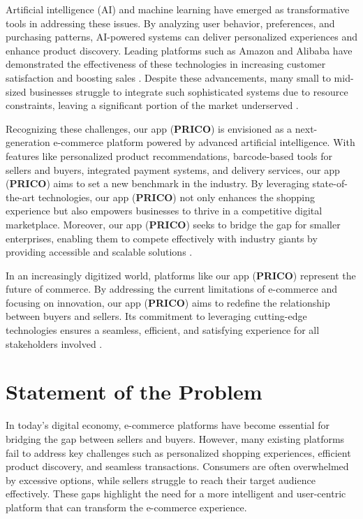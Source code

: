\documentclass[12pt]{report}
\begin{document}
Artificial intelligence (AI) and machine learning have emerged as transformative tools in
addressing these issues. By analyzing user behavior, preferences, and purchasing patterns,
AI-powered systems can deliver personalized experiences and enhance product discovery.
Leading platforms such as Amazon and Alibaba have demonstrated the effectiveness of these
technologies in increasing customer satisfaction and boosting sales \cite{c2}\cite{c3}. Despite these
advancements, many small to mid-sized businesses struggle to integrate such sophisticated
systems due to resource constraints, leaving a significant portion of the market underserved
\cite{c3}.

Recognizing these challenges, our app (\textbf{PRICO}) is envisioned as a next-generation
e-commerce platform powered by advanced artificial intelligence. With features like
personalized product recommendations, barcode-based tools for sellers and buyers, integrated
payment systems, and delivery services, our app (\textbf{PRICO}) aims to set a new benchmark in
the industry. By leveraging state-of-the-art technologies, our app (\textbf{PRICO}) not only enhances
the shopping experience but also empowers businesses to thrive in a competitive digital
marketplace. Moreover, our app (\textbf{PRICO}) seeks to bridge the gap for smaller enterprises,
enabling them to compete effectively with industry giants by providing accessible and
scalable solutions \cite{c1}\cite{c4}.

In an increasingly digitized world, platforms like our app (\textbf{PRICO}) represent the future of
commerce. By addressing the current limitations of e-commerce and focusing on innovation,
our app (\textbf{PRICO}) aims to redefine the relationship between buyers and sellers. Its
commitment to leveraging cutting-edge technologies ensures a seamless, efficient, and
satisfying experience for all stakeholders involved \cite{c2}\cite{c5}.

\section{Statement of the Problem}

In today's digital economy, e-commerce platforms have become essential for bridging the gap
between sellers and buyers. However, many existing platforms fail to address key challenges
such as personalized shopping experiences, efficient product discovery, and seamless
transactions. Consumers are often overwhelmed by excessive options, while sellers struggle
to reach their target audience effectively. These gaps highlight the need for a more intelligent
and user-centric platform that can transform the e-commerce experience.
\end{document}
